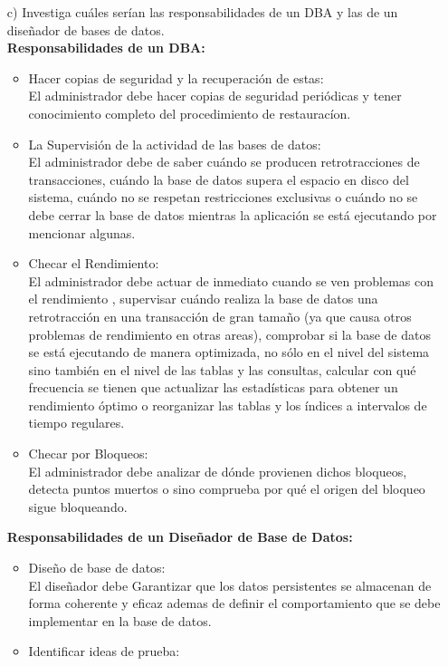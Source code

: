 \documentclass[a4paper, 12pt]{report}
\begin{document}
\begin{enumerate}
{\begin{enumerate}
    \item[c)] Investiga cuáles serían las responsabilidades de un DBA y las de un diseñador de bases de datos.\\
    \textbf{Responsabilidades de un DBA:}
    \begin{itemize}
    	\item Hacer copias de seguridad y la recuperación de estas:\\
    	El administrador debe hacer copias de seguridad periódicas y tener conocimiento completo del procedimiento de restauracíon.
    	\item La Supervisión de la actividad de las bases de datos:\\
    	El administrador debe de saber cuándo se producen retrotracciones de transacciones, cuándo  la base de datos supera el espacio en disco del sistema, cuándo no se respetan restricciones exclusivas o cuándo no se debe cerrar la base de datos mientras la aplicación se está ejecutando por mencionar algunas. 
    	\item Checar el Rendimiento:\\
    	El administrador debe actuar de inmediato cuando se ven problemas con el rendimiento , supervisar cuándo realiza la base de datos una retrotracción en una transacción de gran tamaño (ya que causa otros problemas de rendimiento en otras areas), comprobar si la base de datos se está ejecutando de manera optimizada, no sólo en el nivel del sistema sino también en el nivel de las tablas y las consultas, calcular con qué frecuencia se tienen que actualizar las estadísticas para obtener un rendimiento óptimo o reorganizar las tablas y los índices a intervalos de tiempo regulares. 
    	\item Checar por Bloqueos:\\
    	El administrador debe analizar de dónde provienen dichos bloqueos, detecta puntos muertos o sino comprueba por qué el origen del bloqueo sigue bloqueando. 
    \end{itemize}
    \textbf{Responsabilidades de un Diseñador de Base de Datos:}
    \begin{itemize}
    	\item Diseño de base de datos:\\
    	El diseñador debe Garantizar que los datos persistentes se almacenan de forma coherente y eficaz ademas de definir el comportamiento que se debe implementar en la base de datos. 
    	\item Identificar ideas de prueba:\\

\end{itemize}
\end{enumerate}}
\end{enumerate}
\end{document}
